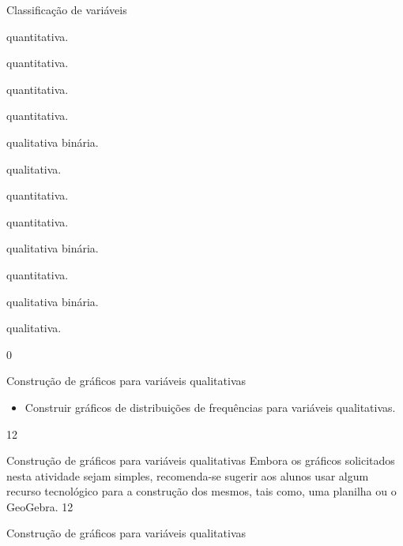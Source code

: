 {\begin{answer}{Classificação de variáveis}
{\begin{enumerate}
\begin{multicols}{3}
 \item quantitativa.
 \item quantitativa.
 \item quantitativa.
 \item quantitativa. 
 \item qualitativa binária.
 \item qualitativa.
 \item quantitativa. 
 \item quantitativa.
 \item qualitativa binária.
 \item quantitativa.
 \item qualitativa binária.
 \item qualitativa.
 \end{multicols}
\end{enumerate}
}{0}
\end{answer}
\clearmargin
\begin{objectives}{Construção de gráficos para variáveis qualitativas}
{
\begin{itemize}
\item Construir gráficos de distribuições de frequências para variáveis qualitativas.
\end{itemize}
}{1}{2}
\end{objectives}
\begin{sugestions}{Construção de gráficos para variáveis qualitativas}
{
Embora os gráficos solicitados nesta atividade sejam simples, recomenda-se sugerir aos alunos usar algum recurso tecnológico para a construção dos mesmos, tais como, uma planilha ou o GeoGebra.
}{1}{2}
\end{sugestions}
\begin{answer}{Construção de gráficos para variáveis qualitativas}
{
\begin{figure}[H]
\centering


\end{figure}}
\end{answer}}
